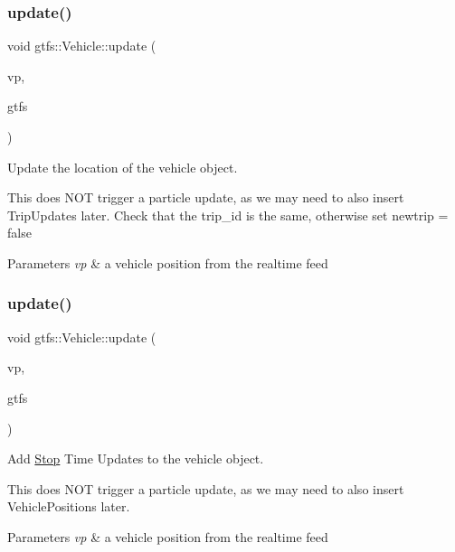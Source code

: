 \subsubsection{\texorpdfstring{update()}{update()}\hspace{0.1cm}{\footnotesize\ttfamily [1/2]}}
{\footnotesize\ttfamily void gtfs\+::\+Vehicle\+::update (\begin{DoxyParamCaption}\item[{const transit\+\_\+realtime\+::\+Vehicle\+Position \&}]{vp,  }\item[{\hyperlink{classgtfs_1_1GTFS}{G\+T\+FS} \&}]{gtfs }\end{DoxyParamCaption})}

Update the location of the vehicle object.

This does N\+OT trigger a particle update, as we may need to also insert Trip\+Updates later. Check that the trip\+\_\+id is the same, otherwise set {\ttfamily newtrip = false}


\begin{DoxyParams}{Parameters}
{\em vp} & a vehicle position from the realtime feed \\
\hline
\end{DoxyParams}
\mbox{\label{classgtfs_1_1Vehicle_ae9944f06fb0bde02f2d7c21f2dc33787}} 
\subsubsection{\texorpdfstring{update()}{update()}\hspace{0.1cm}{\footnotesize\ttfamily [2/2]}}
{\footnotesize\ttfamily void gtfs\+::\+Vehicle\+::update (\begin{DoxyParamCaption}\item[{const transit\+\_\+realtime\+::\+Trip\+Update \&}]{vp,  }\item[{\hyperlink{classgtfs_1_1GTFS}{G\+T\+FS} \&}]{gtfs }\end{DoxyParamCaption})}

Add \hyperlink{classgtfs_1_1Stop}{Stop} Time Updates to the vehicle object.

This does N\+OT trigger a particle update, as we may need to also insert Vehicle\+Positions later.


\begin{DoxyParams}{Parameters}
{\em vp} & a vehicle position from the realtime feed \\
\hline
\end{DoxyParams}



